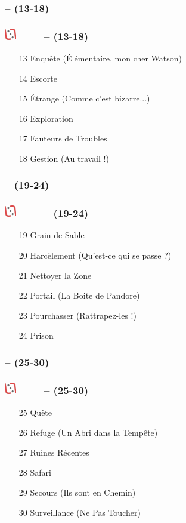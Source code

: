 \documentclass[slidetop,11pt]{beamer}
\def\moreInFrameTitleLeftt{\includegraphics[height=0.5cm]{img/ligueludique-0.png}~~~~~}
\begin{document}
\subsubsection{\sectionPartIIbII  -- (13-18)}
\begin{frame}
	\frametitle{\moreInFrameTitleLeftt \sectionPartIIbII  -- (13-18)}
	\begin{enumerate}
		\item[13] Enqu{\^e}te ({\'E}l{\'e}mentaire, mon cher Watson)
		\item[14] Escorte
		\item[15] {\'E}trange (Comme c'est bizarre...)
		\item[16] Exploration
		\item[17] Fauteurs de Troubles
		\item[18] Gestion (Au travail !)
	\end{enumerate}
\end{frame} 

\subsubsection{\sectionPartIIbII -- (19-24)}
\begin{frame}
	\frametitle{\moreInFrameTitleLeftt \sectionPartIIbII  -- (19-24)}
	\begin{enumerate}
		\item[19] Grain de Sable
		\item[20] Harc{\`e}lement (Qu'est-ce qui se passe ?)
		\item[21] Nettoyer la Zone
		\item[22] Portail (La Boite de Pandore)
		\item[23] Pourchasser (Rattrapez-les !)
		\item[24] Prison
	\end{enumerate}
\end{frame} 

\subsubsection{\sectionPartIIbII  -- (25-30)}
\begin{frame}
	\frametitle{\moreInFrameTitleLeftt \sectionPartIIbII  -- (25-30)}
	\begin{enumerate}
		\item[25] Qu{\^e}te
		\item[26] Refuge (Un Abri dans la Temp{\^e}te)
		\item[27] Ruines R{\'e}centes
		\item[28] Safari
		\item[29] Secours (Ils sont en Chemin)
		\item[30] Surveillance (Ne Pas Toucher)
	\end{enumerate}
\end{frame} 
\end{document}
